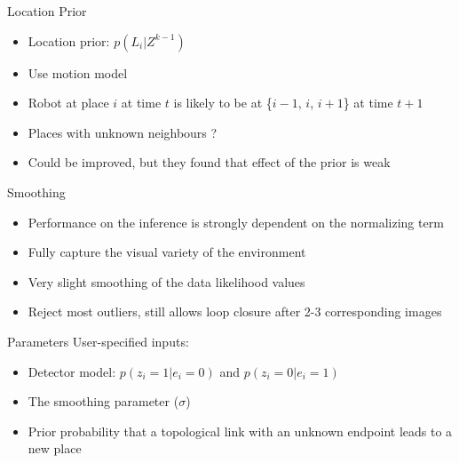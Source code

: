 \begin{frame}{Location Prior}
    \begin{itemize}
        \item Location prior: $p(L_i|Z^{k-1})$
        \item Use motion model
        \item Robot at place $i$ at time $t$ is likely to be at \{$i-1$, $i$, $i+1$\} at time $t+1$
        \item Places with unknown neighbours ?
        \item Could be improved, but they found that effect of the prior is weak
    \end{itemize}
\end{frame}

\begin{frame}{Smoothing}
    \begin{itemize}
        \item Performance on the inference is strongly dependent on the normalizing term
        \item Fully capture the visual variety of the environment
        \item Very slight smoothing of the data likelihood values
        \item Reject most outliers, still allows loop closure after 2-3 corresponding images
    \end{itemize}
\end{frame}

\begin{frame}{Parameters}
    User-specified inputs:
    \begin{itemize}
        \item Detector model: $p(z_i=1|e_i=0)$ and $p(z_i=0|e_i=1)$
        \item The smoothing parameter ($\sigma$)
        \item Prior probability that a topological link with an unknown endpoint leads to a new place
    \end{itemize}
\end{frame}


